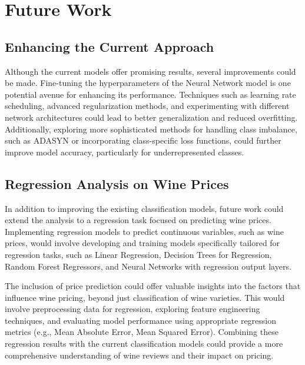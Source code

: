 \section{Future Work}

\subsection{Enhancing the Current Approach}
Although the current models offer promising results, several improvements could be made. Fine-tuning the hyperparameters of the Neural Network model is one potential avenue for enhancing its performance. Techniques such as learning rate scheduling, advanced regularization methods, and experimenting with different network architectures could lead to better generalization and reduced overfitting. Additionally, exploring more sophisticated methods for handling class imbalance, such as ADASYN or incorporating class-specific loss functions, could further improve model accuracy, particularly for underrepresented classes.

\subsection{Regression Analysis on Wine Prices}
In addition to improving the existing classification models, future work could extend the analysis to a regression task focused on predicting wine prices. Implementing regression models to predict continuous variables, such as wine prices, would involve developing and training models specifically tailored for regression tasks, such as Linear Regression, Decision Trees for Regression, Random Forest Regressors, and Neural Networks with regression output layers.

The inclusion of price prediction could offer valuable insights into the factors that influence wine pricing, beyond just classification of wine varieties. This would involve preprocessing data for regression, exploring feature engineering techniques, and evaluating model performance using appropriate regression metrics (e.g., Mean Absolute Error, Mean Squared Error). Combining these regression results with the current classification models could provide a more comprehensive understanding of wine reviews and their impact on pricing.

